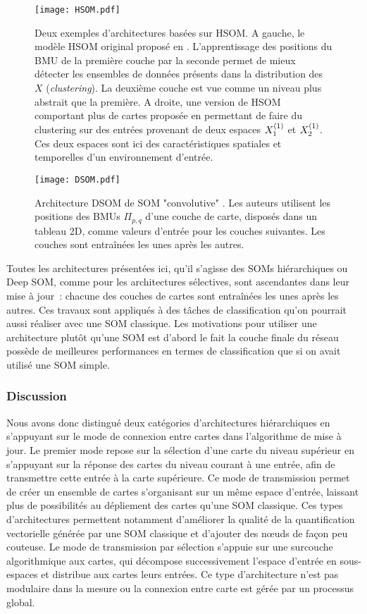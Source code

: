 \documentclass[../main]{subfiles}
\begin{document}
{\begin{figure}[t]
    \centering
    \texttt{[image: HSOM.pdf]}
    \caption{Deux exemples d'architectures basées sur HSOM. A gauche, le modèle HSOM original proposé en \cite{lampinen_clustering_1992}. L'apprentissage des positions du BMU de la première couche par la seconde permet de mieux détecter les ensembles de données présents dans la distribution des $X$ (\emph{clustering}).
    La deuxième couche est vue comme un niveau plus abstrait que la première. 
    A droite, une version de HSOM comportant plus de cartes proposée en \cite{hagenauer_hierarchical_2013} permettant de faire du clustering sur des entrées provenant de deux espaces $X_1^{({1})}$ et $X_2^{({1})}$. Ces deux espaces sont ici des caractéristiques spatiales et temporelles d'un environnement d'entrée.
    \label{fig:hsom}}
\end{figure}

\begin{figure}[t]
    \texttt{[image: DSOM.pdf]}
    \caption{Architecture DSOM de SOM "convolutive" \cite{liu_deep_2015}. Les auteurs utilisent les positions des BMUs $\Pi_{p,q}$ d'une couche de carte, disposés dans un tableau 2D, comme valeurs d'entrée pour les couches suivantes. Les couches sont entraînées les unes après les autres. \label{fig:dsom}}
\end{figure}

Toutes les architectures présentées ici, qu'il s'agisse des SOMs hiérarchiques ou Deep SOM, comme pour les architectures sélectives, sont ascendantes dans leur mise à jour~: chacune des couches de cartes sont entraînées les unes après les autres. 
Ces travaux sont appliqués à des tâches de classification qu'on pourrait aussi réaliser avec une SOM classique.
Les motivations pour utiliser une architecture plutôt qu'une SOM est d'abord le fait la couche finale du réseau possède de meilleures performances en termes de classification que si on avait utilisé une SOM simple.

\subsubsection{Discussion}

Nous avons donc distingué deux catégories d'architectures hiérarchiques en s'appuyant sur le mode de connexion entre cartes dans l'algorithme de mise à jour. 
Le premier mode repose sur la sélection d'une carte du niveau supérieur en s'appuyant sur la réponse des cartes du niveau courant à une entrée, afin de transmettre cette entrée à la carte supérieure. Ce mode de transmission permet de créer un ensemble de cartes s'organisant sur un même espace d'entrée, laissant plus de possibilités au dépliement des cartes qu'une SOM classique. Ces types d'architectures permettent notamment d'améliorer la qualité de la quantification vectorielle générée par une SOM classique et d'ajouter des n\oe{}uds de façon peu couteuse. Le mode de transmission par sélection s'appuie sur une surcouche algorithmique aux cartes, qui décompose successivement l'espace d'entrée en sous-espaces et distribue aux cartes leurs entrées. Ce type d'architecture n'est pas modulaire dans la mesure ou la connexion entre carte est gérée par un processus global.

}
\end{document}
